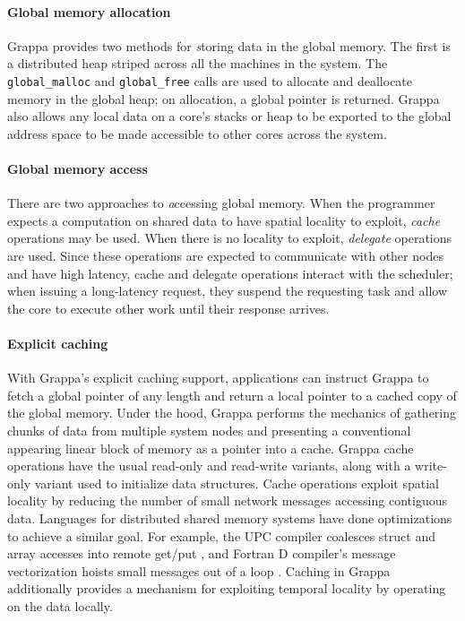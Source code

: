 \paragraph{Global memory allocation}
Grappa provides two methods for {\emph storing} data in the global memory. The
first is a distributed heap striped across all the machines in the
system. The \texttt{global\_malloc} and \texttt{global\_free} calls
are used to allocate and deallocate memory in the global heap; on
allocation, a global pointer is returned. Grappa also allows any local
data on a core's stacks or heap to be exported to the global address
space to be made accessible to other cores across the system.

\paragraph{Global memory access} There are two approaches to {\emph
accessing} global memory. When the programmer expects a computation on
shared data to have spatial locality to exploit, {\em cache} operations
may be used. When there is no locality to exploit, {\em delegate}
operations are used. Since these operations are expected to communicate
with other nodes and have high latency, cache and delegate operations
interact with the scheduler; when issuing a long-latency request, they
suspend the requesting task and allow the core to execute other work
until their response arrives.

\paragraph{Explicit caching} With Grappa's explicit caching support,
applications can instruct Grappa to fetch a global pointer of any length
and return a local pointer to a cached copy of the global memory. Under
the hood, Grappa performs the mechanics of gathering chunks of data from
multiple system nodes and presenting a conventional appearing linear
block of memory as a pointer into a cache. Grappa cache operations have
the usual read-only and read-write variants, along with a write-only
variant used to initialize data structures. Cache operations exploit
spatial locality by reducing the number of small network messages
accessing contiguous data. Languages for distributed shared memory
systems have done optimizations to achieve a similar goal. For example,
the UPC compiler coalesces struct and array accesses into remote get/put
\cite{Chen:2005}, and Fortran D compiler's message vectorization hoists
small messages out of a loop \cite{FortranD:1992}. Caching in Grappa
additionally provides a mechanism for exploiting temporal locality by
operating on the data locally. 

